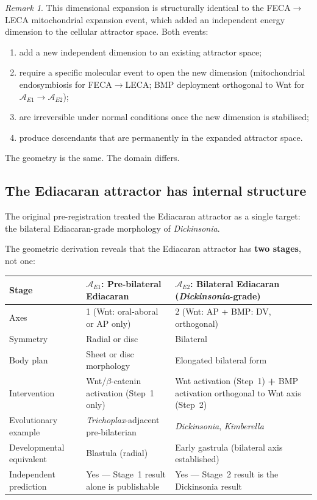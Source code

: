 \documentclass[12pt, a4paper]{article}
\theoremstyle{definition}
\theoremstyle{remark}
\newtheorem{remark}{Remark}[section]
\begin{document}
\begin{remark}
This dimensional expansion is structurally identical to
the FECA$\to$LECA mitochondrial expansion event, which
added an independent energy dimension to the cellular
attractor space. Both events:
\begin{enumerate}[label=(\roman*)]
  \item add a new independent dimension to an existing
        attractor space;
  \item require a specific molecular event to open the
        new dimension (mitochondrial endosymbiosis for
        FECA$\to$LECA; BMP deployment orthogonal to Wnt
        for $\mathcal{A}_{E1} \to \mathcal{A}_{E2}$);
  \item are irreversible under normal conditions once
        the new dimension is stabilised;
  \item produce descendants that are permanently in
        the expanded attractor space.
\end{enumerate}
The geometry is the same. The domain differs.
\end{remark}

\subsection{The Ediacaran attractor has internal structure}

The original pre-registration treated the Ediacaran
attractor as a single target: the bilateral Ediacaran-grade
morphology of \textit{Dickinsonia}.

The geometric derivation reveals that the Ediacaran
attractor has \textbf{two stages}, not one:

\begin{center}
\begin{tabular}{p{3cm}p{4.5cm}p{4.5cm}}
\toprule
\textbf{Stage} & \textbf{$\mathcal{A}_{E1}$:
Pre-bilateral Ediacaran} &
\textbf{$\mathcal{A}_{E2}$: Bilateral Ediacaran
(\textit{Dickinsonia}-grade)} \\
\midrule
Axes & 1 (Wnt: oral-aboral or AP only) &
2 (Wnt: AP + BMP: DV, orthogonal) \\
Symmetry & Radial or disc & Bilateral \\
Body plan & Sheet or disc morphology &
Elongated bilateral form \\
Intervention &
Wnt/$\beta$-catenin activation (Step~1 only) &
Wnt activation (Step~1) \textbf{+}
BMP activation orthogonal to Wnt axis (Step~2) \\
Evolutionary example &
\textit{Trichoplax}-adjacent pre-bilaterian &
\textit{Dickinsonia}, \textit{Kimberella} \\
Developmental equivalent &
Blastula (radial) &
Early gastrula (bilateral axis established) \\
Independent prediction & Yes --- Stage~1 result
alone is publishable & Yes --- Stage~2 result
is the Dickinsonia result \\
\bottomrule
\end{tabular}
\end{center}
\end{document}

